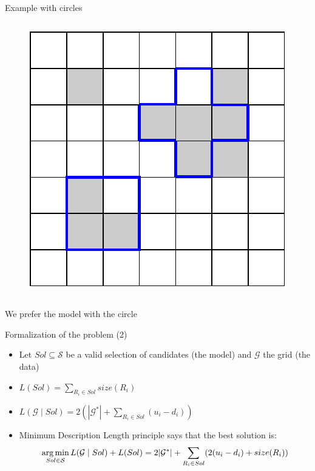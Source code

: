 \documentclass[10pt]{beamer}
\begin{document}
\begin{frame}{Example with circles}
\begin{columns}[T, onlytextwidth]
        \begin{figure}
            \centering
            \includegraphics[scale=0.5]{figures/running-example/MDL/example-3.pdf}
        \end{figure}
    \end{columns}
    \centering We prefer the model with the circle
\end{frame}

\begin{frame}{Formalization of the problem (2)}
    \begin{itemize}
        \item Let $Sol \subseteq \mathcal{S}$ be a valid selection of candidates (the model) and $\mathcal{G}$ the grid (the data)
        \item $L(Sol) = \sum_{R_i \in Sol} size(R_i)$
        \item $L(\mathcal{G}\mid Sol) = 2(|\mathcal{G}^*| + \sum_{R_i \in Sol} (u_i - d_i))$
        \item Minimum Description Length principle says that the best solution is:
            \begin{equation*}
                \operatorname*{arg\,min}_{Sol \in \mathcal{S}} L(\mathcal{G} \mid Sol) + L(Sol) = 2|\mathcal{G}^*| + \sum_{R_i \in Sol} (2(u_i - d_i) + size(R_i))
            \end{equation*}
    \end{itemize}
\end{frame}
\end{document}
